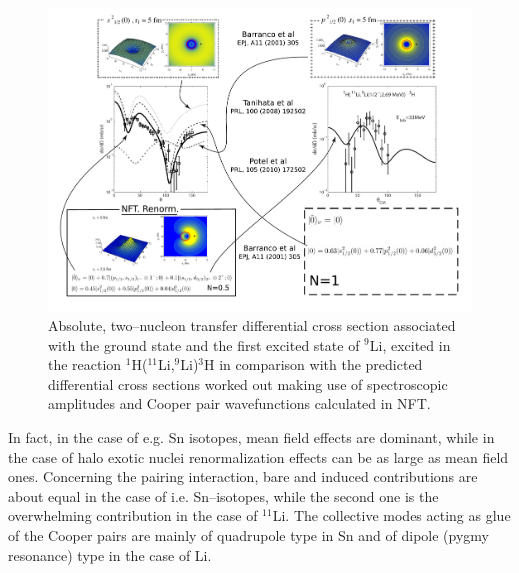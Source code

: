   \begin{figure}
  \centerline{\includegraphics*[width=18cm,angle=0]{C8/figsC8/fig8_1_3}}
  	\caption{Absolute, two--nucleon transfer differential cross section associated with the ground state and the first 	excited state of $^9$Li, excited  in the reaction $^1$H($^{11}$Li,$^9$Li)$^3$H \citep{Tanihata:08} in comparison with the predicted differential cross sections \citep{Potel:10} worked out making use of spectroscopic amplitudes and Cooper pair wavefunctions calculated in NFT.}\label{fig8_1_2}
  \end{figure}
 In fact, in the case of e.g. Sn isotopes, mean field effects are dominant, while in the case of halo exotic nuclei renormalization effects can be as large as mean field ones. Concerning the pairing interaction, bare and induced contributions are about equal in the case of i.e. Sn--isotopes, while the second one is the overwhelming contribution in the case of $^{11}$Li. The collective modes acting as glue of the Cooper pairs are mainly of quadrupole type in Sn and of dipole (pygmy resonance) type in the case of Li. 

 
 
 
 
 
 

